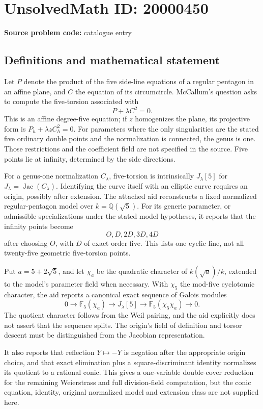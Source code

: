 \documentclass[11pt]{article}
\newcommand{\Q}{\mathbb{Q}}
\newcommand{\F}{\mathbb{F}}
\begin{document}
\section*{UnsolvedMath ID: 20000450}
\textbf{Source problem code:} catalogue entry
\subsection{Definitions and mathematical statement}
Let \(P\) denote the product of the five side-line equations of a regular pentagon in an affine plane, and \(C\) the equation of its circumcircle. McCallum's question asks to compute the five-torsion associated with
\[
P+\lambda C^2=0.
\]
This is an affine degree-five equation; if \(z\) homogenizes the plane, its projective form is \(P_h+\lambda zC_h^2=0\). For parameters where the only singularities are the stated five ordinary double points and the normalization is connected, the genus is one. Those restrictions and the coefficient field are not specified in the source. Five points lie at infinity, determined by the side directions.

For a genus-one normalization \(C_\lambda\), five-torsion is intrinsically \(J_\lambda[5]\) for \(J_\lambda=\operatorname{Jac}(C_\lambda)\). Identifying the curve itself with an elliptic curve requires an origin, possibly after extension. The attached aid reconstructs a fixed normalized regular-pentagon model over \(k=\Q(\sqrt5)\). For its generic parameter, or admissible specializations under the stated model hypotheses, it reports that the infinity points become
\[
O,D,2D,3D,4D
\]
after choosing \(O\), with \(D\) of exact order five. This lists one cyclic line, not all twenty-five geometric five-torsion points.

Put \(a=5+2\sqrt5\), and let \(\chi_a\) be the quadratic character of \(k(\sqrt a)/k\), extended to the model's parameter field when necessary. With \(\chi_5\) the mod-five cyclotomic character, the aid reports a canonical exact sequence of Galois modules
\[
0\longrightarrow\F_5(\chi_a)\longrightarrow J_\lambda[5]
\longrightarrow\F_5(\chi_5\chi_a)\longrightarrow0.
\]
The quotient character follows from the Weil pairing, and the aid explicitly does not assert that the sequence splits. The origin's field of definition and torsor descent must be distinguished from the Jacobian representation.

It also reports that reflection \(Y\mapsto-Y\) is negation after the appropriate origin choice, and that exact elimination plus a square-discriminant identity normalizes its quotient to a rational conic. This gives a one-variable double-cover reduction for the remaining Weierstrass and full division-field computation, but the conic equation, identity, original normalized model and extension class are not supplied here.
\end{document}

